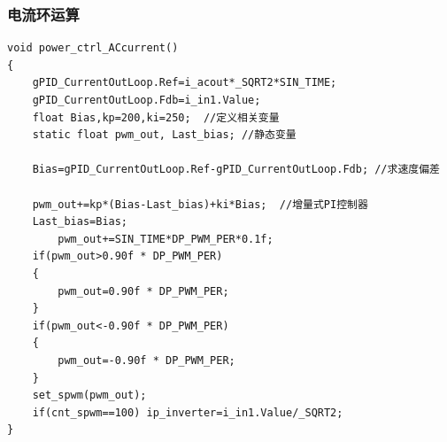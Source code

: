 \documentclass[a4paper,12pt]{article}
\begin{document}
\subsubsection{电流环运算}\label{current}
\begin{verbatim}
void power_ctrl_ACcurrent()
{
    gPID_CurrentOutLoop.Ref=i_acout*_SQRT2*SIN_TIME;
    gPID_CurrentOutLoop.Fdb=i_in1.Value;
    float Bias,kp=200,ki=250;  //定义相关变量
    static float pwm_out, Last_bias; //静态变量

    Bias=gPID_CurrentOutLoop.Ref-gPID_CurrentOutLoop.Fdb; //求速度偏差

    pwm_out+=kp*(Bias-Last_bias)+ki*Bias;  //增量式PI控制器
    Last_bias=Bias;  
        pwm_out+=SIN_TIME*DP_PWM_PER*0.1f;
    if(pwm_out>0.90f * DP_PWM_PER)
    {
        pwm_out=0.90f * DP_PWM_PER;
    }
    if(pwm_out<-0.90f * DP_PWM_PER)
    {
        pwm_out=-0.90f * DP_PWM_PER;
    }
    set_spwm(pwm_out);
    if(cnt_spwm==100) ip_inverter=i_in1.Value/_SQRT2;
}
\end{verbatim}
\end{document}
